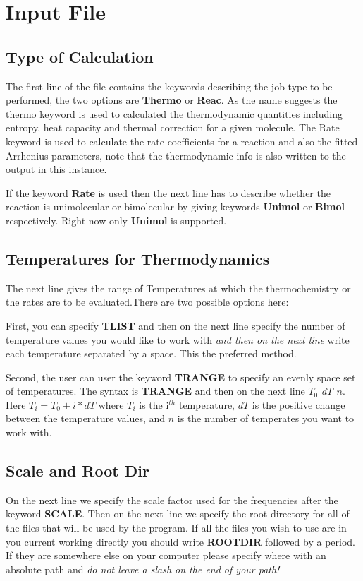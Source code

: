 \documentclass[a4paper,12pt]{article}
\begin{document}
\section{Input File}
\subsection{Type of Calculation}
The first line of the file contains the keywords describing the job type to be performed, the two options are \textbf{Thermo} or \textbf{Reac}. As the name suggests the thermo keyword is used to calculated the thermodynamic quantities including entropy, heat capacity and thermal correction for a given molecule. The Rate keyword is used to calculate the rate coefficients for a reaction and also the fitted Arrhenius parameters, note that the thermodynamic info is also written to the output in this instance.

If the keyword \textbf{Rate} is used then the next line has to describe whether the reaction is unimolecular or bimolecular by giving keywords \textbf{Unimol} or \textbf{Bimol} respectively. Right now only \textbf{Unimol} is supported.

\subsection{Temperatures for Thermodynamics}
The next line gives the range of Temperatures at which the thermochemistry or the rates are to be evaluated.There are two possible options here:

First, you can specify \textbf{TLIST} and then on the next line specify the number of temperature values you would like to work with \textit{and then on the next line} write each temperature separated by a space. This the preferred method.

Second, the user can user the keyword \textbf{TRANGE} to specify an evenly space set of temperatures.
The syntax is \textbf{TRANGE} and then on the next line \textbf{$T_0$ $dT$ $n$}. Here $T_i = T_0 + i*dT$ where $T_i$ is the i$^{th}$ temperature, $dT$ is the positive change between the temperature values, and $n$ is the number of temperates you want to work with.

\subsection{Scale and Root Dir}
On the next line we specify the scale factor used for the frequencies after the keyword \textbf{SCALE}.
Then on the next line we specify the root directory for all of the files that will be used by the program. If all the files you wish to use are in you current working directly you should write \textbf{ROOTDIR} followed by a period. If they are somewhere else on your computer please specify where with an absolute path and \textit{do not leave a slash on the end of your path!}
\end{document}
